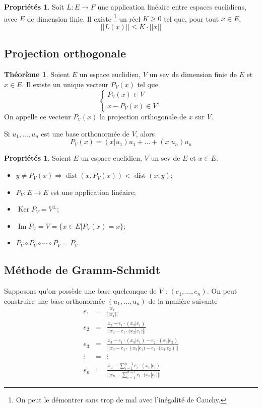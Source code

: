 \documentclass[11pt,a4paper]{article}
\theoremstyle{definition}
\newtheorem{myprop}[mydef]{Propriétés}
\newtheorem{mytheo}[mydef]{Théorème}
\DeclareMathOperator{\dist}{dist}
\DeclareMathOperator{\Ker}{Ker}
\DeclareMathOperator{\newIm}{Im}
\begin{document}
\begin{myprop}
	Soit $L : E \to F$ une application linéaire entre espaces euclidiens, avec $E$ de dimension finie.
	Il existe
	\footnote{On peut le démontrer sans trop de mal avec l'inégalité de Cauchy.}
	un réel $K \geq 0$ tel que, pour tout $x \in E$,
	\[ ||L(x)|| \leq K \cdot ||x|| \]
\end{myprop}

\subsection{Projection orthogonale}
\begin{mytheo}
	Soient $E$ un espace euclidien, $V$ un sev de dimension finie de $E$ et $x \in E$.
	Il existe un unique vecteur $P_V(x)$ tel que
	\[
	\left\{
	\begin{array}{l}
		P_V(x) \in V\\
		x - P_V(x) \in V^{\perp}
	\end{array}
	\right.
	\]
	On appelle ce vecteur $P_V(x)$ la projection orthogonale de $x$ sur $V$.

	Si $u_1, \ldots, u_n$ est une base orthonormée de $V$, alors
	\[ P_V(x) = (x|u_1)u_1 + \ldots + (x|u_n)u_n \]
\end{mytheo}

\begin{myprop}
	Soient $E$ un espace euclidien, $V$ un sev de $E$ et $x \in E$.
	\begin{itemize}
		\item $y \neq P_V(x) \Rightarrow \dist(x, P_V(x)) < \dist(x, y)$;
		\item $P_V : E \to E$ est une application linéaire;
		\item $\Ker P_V = V^{\perp}$;
		\item $\newIm P_V = V = \{x \in E | P_V(x) = x\}$;
		\item $P_V \circ P_V \circ \cdots \circ P_V = P_V$.
	\end{itemize}
\end{myprop}

\subsection{Méthode de Gramm-Schmidt}

Supposons qu'on possède une base quelconque de $V$ : $(e_1, \dots , e_n)$. On peut construire une base orthonormée $(u_1, \dots, u_n)$ de la manière suivante
\begin{eqnarray*}
	e_1 &=& \frac{x_1}{||x_1||}\\
	e_2 &=& \frac{x_2 - e_1 \cdot (x_2|e_1)}{||x_2 - e_1 \cdot (x_2|e_1)||}\\
	e_3 &=& \frac{x_3 - e_1 \cdot (x_3|e_1) - e_2 \cdot (x_3|e_2)}{||x_3 - e_1 \cdot (x_3|e_1) - e_2 \cdot (x_3|e_2)||}\\
	\vdots &=& \vdots\\
	e_n &=& \frac{ x_n - \sum_{i=1}^{n-1} e_i \cdot (x_n|e_i) }{ || x_n - \sum_{i=1}^{n-1} e_i \cdot (x_n|e_i) || }
\end{eqnarray*}
\end{document}
